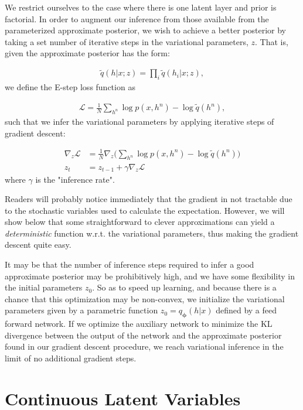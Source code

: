 \documentclass{article}
\newcommand{\vects}[1]{\boldsymbol{#1}}
\newcommand{\PP}[0]{\vects{\phi}}
\newcommand{\grad}[0]{\nabla}
\newcommand{\LL}[0]{\mathcal{L}}
\begin{document}
We restrict ourselves to the case where there is one latent layer and prior is factorial. In order to augment our inference from those available from the parameterized approximate posterior, we wish to achieve a better posterior by taking a set number of iterative steps in the variational parameters, $z$. That is, given the approximate posterior has the form:

\begin{align}
\tilde{q}(h|x; z) = \prod_i \tilde{q}(h_i|x; z),
\end{align}
we define the E-step loss function as

\begin{align}
\LL = \frac{1}{N} \sum_{h^n} \log p(x, h^n) - \log \tilde{q}(h^n),
\end{align}
such that we infer the variational parameters by applying iterative steps of gradient descent:

\begin{align}
\grad_z \LL &= \frac{1}{N} \grad_z \big(\sum_{h^n} \log p(x, h^n) - \log \tilde{q}(h^n)\big)\\
z_t &= z_{t-1} + \gamma \grad_z \LL
\end{align}
where $\gamma$ is the "inference rate".

Readers will probably notice immediately that the gradient in not tractable due to the stochastic variables used to calculate the expectation. However, we will show below that some straightforward to clever approximations can yield a \emph{deterministic} function w.r.t. the variational parameters, thus making the gradient descent quite easy.

It may be that the number of inference steps required to infer a good approximate posterior may be prohibitively high, and we have some flexibility in the initial parameters $z_0$. So as to speed up learning, and because there is a chance that this optimization may be non-convex, we initialize the variational parameters given by a parametric function $z_0 = q_{\PP}(h|x)$ defined by a feed forward network. If we optimize the auxiliary network to minimize the KL divergence between the output of the network and the approximate posterior found in our gradient descent procedure, we reach variational inference in the limit of no additional gradient steps.

\section{Continuous Latent Variables}
\end{document}
